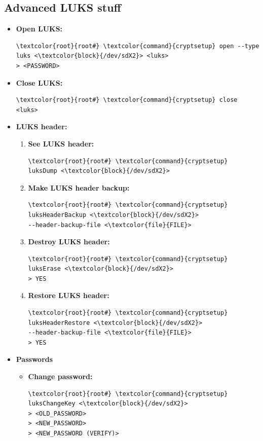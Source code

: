 \documentclass[10pt, a4paper, onecolumn, oneside, titlepage, openany]{book}
\begin{document}
    \subsection{Advanced LUKS stuff}
\begin{itemize}
    \item \textbf{Open LUKS:}
\begin{Verbatim}[commandchars=\\\{\}]
\textcolor{root}{root#} \textcolor{command}{cryptsetup} open --type luks <\textcolor{block}{/dev/sdX2}> <luks>
> <PASSWORD>
\end{Verbatim}
    \item \textbf{Close LUKS:}
\begin{Verbatim}[commandchars=\\\{\}]
\textcolor{root}{root#} \textcolor{command}{cryptsetup} close <luks>
\end{Verbatim}
    \item \textbf{LUKS header:}
    \begin{enumerate}
        \item \textbf{See LUKS header:}
\begin{Verbatim}[commandchars=\\\{\}]
\textcolor{root}{root#} \textcolor{command}{cryptsetup} luksDump <\textcolor{block}{/dev/sdX2}>
\end{Verbatim}
        \item \textbf{Make LUKS header backup:}
\begin{Verbatim}[commandchars=\\\{\}]
\textcolor{root}{root#} \textcolor{command}{cryptsetup} luksHeaderBackup <\textcolor{block}{/dev/sdX2}>
--header-backup-file <\textcolor{file}{FILE}>
\end{Verbatim}
        \item \textbf{Destroy LUKS header:}
\begin{Verbatim}[commandchars=\\\{\}]
\textcolor{root}{root#} \textcolor{command}{cryptsetup} luksErase <\textcolor{block}{/dev/sdX2}>
> YES
\end{Verbatim}
        \item \textbf{Restore LUKS header:}
\begin{Verbatim}[commandchars=\\\{\}]
\textcolor{root}{root#} \textcolor{command}{cryptsetup} luksHeaderRestore <\textcolor{block}{/dev/sdX2}>
--header-backup-file <\textcolor{file}{FILE}>
> YES
\end{Verbatim}
    \end{enumerate}
    \item \textbf{Passwords}
    \begin{itemize}
        \item \textbf{Change password:}
\begin{Verbatim}[commandchars=\\\{\}]
\textcolor{root}{root#} \textcolor{command}{cryptsetup} luksChangeKey <\textcolor{block}{/dev/sdX2}>
> <OLD_PASSWORD>
> <NEW_PASSWORD>
> <NEW_PASSWORD (VERIFY)>
\end{Verbatim}
    \end{itemize}
\end{itemize}
\end{document}
